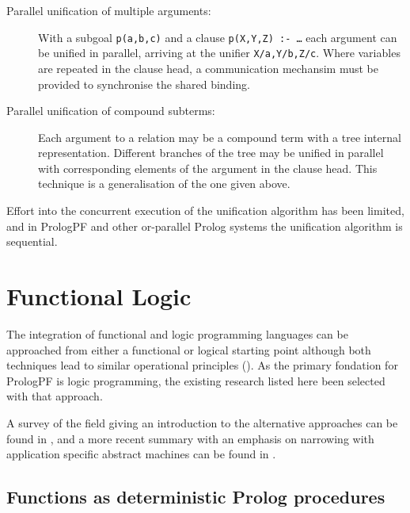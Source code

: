 \begin{description}
\item[Parallel unification of multiple arguments:]{ With a subgoal \texttt{p(a,b,c)} and
  a clause \texttt{p(X,Y,Z) :- \ldots} each argument can be unified in parallel, arriving at
  the unifier \texttt{X/a,Y/b,Z/c}.  Where variables are repeated in the clause head,
  a communication mechansim must be provided to synchronise the shared binding.}
\item[Parallel unification of compound subterms:]{ Each argument to a relation may be 
  a compound term with a tree internal representation.  Different branches of the
  tree may be unified in parallel with corresponding elements of the argument in the
  clause head.  This technique is a generalisation of the one given above.}
\end{description}

Effort into the concurrent execution of the unification algorithm has been limited, and
in PrologPF and other or-parallel Prolog systems the unification algorithm is 
sequential.

\section{Functional Logic} %

The integration of functional and logic programming languages can be approached from either
a functional or logical starting point although both techniques lead to similar
operational principles (\cite{Han94}).  As the primary fondation for PrologPF is
logic programming, the existing research listed here been selected with that approach.

A survey of the field giving an introduction to the alternative approaches can be found
in \cite{BL86}, and a more recent summary with an emphasis on narrowing \cite{Red85} with
application specific abstract machines can be found in \cite{Han94}.

\subsection{Functions as deterministic Prolog procedures}
\label{det_procs}

